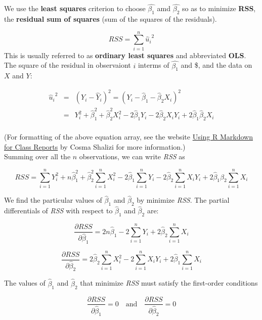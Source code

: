 \documentclass[
]{article}
\begin{document}
We use the \textbf{least squares} criterion to choose
\(\hat{\beta_{1}}\) amd \(\hat{\beta_{2}}\) so as to minimize
\textbf{RSS}, the \textbf{residual sum of squares} (sum of the squares
of the residuals).

\[RSS=\sum_{i=1}^{n}{\hat{u}_{i}}^2\] This is usually referred to as
\textbf{ordinary least squares} and abbreviated \textbf{OLS}.\\
The square of the residual in observaiont \(i\) interms of
\(\hat{\beta_{1}}\) and \$, and the data on \(X\) and
\(Y\):

\begin{eqnarray}
{\hat{u}_{i}}^2 &=&(Y_i-\hat{Y}_{i})^2 =(Y_i-\hat{\beta}_{1}-\hat{\beta}_{2}X_i)^2 \\

&=& Y_i^2+\hat{\beta}_{1}^2+\hat{\beta}_{2}^2X_i^2-2\hat{\beta}_{1}Y_i-2\hat{\beta}_{2}X_iY_i+2\hat{\beta}_{1}\hat{\beta}_{2}X_i \\
\end{eqnarray}

(For formatting of the above equation array, see the website
\href{https://www.stat.cmu.edu/~cshalizi/rmarkdown/}{Using R Markdown
for Class Reports} by Cosma Shalizi for more information.)\\

Summing over all the \(n\) observations, we can write \emph{RSS} as

\[RSS=\sum_{i=1}^{n}Y_i^2+n\hat{\beta}_{1}^2+\hat{\beta}_{2}^2\sum_{i=1}^{n}X_i^2-2\hat{\beta}_{1}\sum_{i=1}^{n}Y_i-2\hat{\beta}_{2}\sum_{i=1}^{n}X_iY_i+2\hat{\beta}_{1}\hat{\beta}_{2}\sum_{i=1}^{n}X_i\]

We find the particular values of \(\hat{\beta}_{1}\) and
\(\hat{\beta}_{2}\) by minimize \emph{RSS}. The partial differentials of
\emph{RSS} with respect to \(\hat{\beta}_{1}\) and \(\hat{\beta}_{2}\)
are:

\[\frac{\partial{RSS}}{\partial{\hat{\beta}_{1}}}=2n\hat{\beta}_{1}-2\sum_{i=1}^{n}Y_i+2\hat{\beta}_{2}\sum_{i=1}^{n}X_i\]

\[\frac{\partial{RSS}}{\partial{\hat{\beta}_{2}}}=2\hat{\beta}_{2}\sum_{i=1}^{n}X_i^2-2\sum_{i=1}^{n}X_iY_i+2\hat{\beta}_{1}\sum_{i=1}^{n}X_i\]

The values of \(\hat{\beta}_{1}\) and \(\hat{\beta}_{2}\) that minimize
\emph{RSS} must satisfy the first-order conditions

\begin{equation}
\frac{\partial{RSS}}{\partial{\hat{\beta}_{1}}}=0
\quad\mathrm{and}\quad
\frac{\partial{RSS}}{\partial{\hat{\beta}_{2}}}=0
\end{equation}
\end{document}
